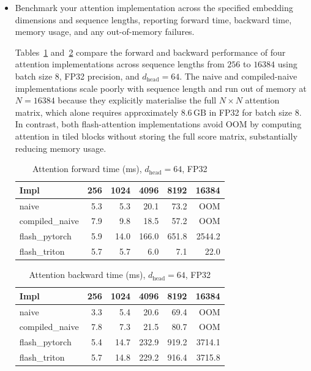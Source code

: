 \documentclass[letterpaper]{article}
\begin{document}
	\begin{itemize}
		\item[(a)] Benchmark your attention implementation across the specified embedding dimensions and sequence lengths, reporting forward time, backward time, memory usage, and any out-of-memory failures.
		
		Tables~\ref{tab:attn-fwd} and~\ref{tab:attn-bwd} compare the forward and backward performance of four attention implementations across sequence lengths from \(256\) to \(16384\) using batch size \(8\), FP32 precision, and \(d_{\text{head}}=64\). The naive and compiled-naive implementations scale poorly with sequence length and run out of memory at \(N=16384\) because they explicitly materialise the full \(N \times N\) attention matrix, which alone requires approximately \(8.6\,\mathrm{GB}\) in FP32 for batch size \(8\). In contrast, both flash-attention implementations avoid OOM by computing attention in tiled blocks without storing the full score matrix, substantially reducing memory usage.
		
		\begin{table}[H]
			\centering
			\caption{Attention forward time (ms), $d_{\text{head}}=64$, FP32}
			\label{tab:attn-fwd}
			\begin{tabular}{lrrrrr}
				\hline
				Impl & 256 & 1024 & 4096 & 8192 & 16384 \\
				\hline
				naive          &  5.3 &  5.3 &  20.1 &  73.2 & OOM \\
				compiled\_naive&  7.9 &  9.8 &  18.5 &  57.2 & OOM \\
				flash\_pytorch & 5.9 & 14.0 & 166.0 & 651.8 & 2544.2 \\
				flash\_triton  &  5.7 &  5.7 &   6.0 &   7.1 &   22.0 \\
				\hline
			\end{tabular}
		\end{table}
		
		\begin{table}[H]
			\centering
			\caption{Attention backward time (ms), $d_{\text{head}}=64$, FP32}
			\label{tab:attn-bwd}
			\begin{tabular}{lrrrrr}
				\hline
				Impl & 256 & 1024 & 4096 & 8192 & 16384 \\
				\hline
				naive          &  3.3 &  5.4 &  20.6 &  69.4 & OOM \\
				compiled\_naive&  7.8 &  7.3 &  21.5 &  80.7 & OOM \\
				flash\_pytorch &  5.4 & 14.7 & 232.9 & 919.2 & 3714.1 \\
				flash\_triton  &  5.7 & 14.8 & 229.2 & 916.4 & 3715.8 \\
				\hline
			\end{tabular}
		\end{table}
		

\end{itemize}
\end{document}
